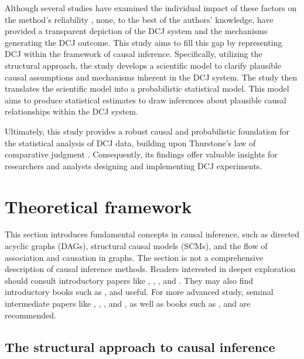 \documentclass[
  authoryear,
  preprint,
  1p]{elsarticle}
\begin{document}
Although several studies have examined the individual impact of these
factors on the method's reliability
\citep{Bramley_2015, Pollitt_2012b, Bramley_et_al_2019, Verhavert_et_al_2019, Crompvoets_et_al_2022, vanDaal_et_al_2017, Gijsen_et_al_2021, Bouwer_et_al_2023},
none, to the best of the authors' knowledge, have provided a transparent
depiction of the DCJ system and the mechanisms generating the DCJ
outcome. This study aims to fill this gap by representing DCJ within the
framework of causal inference. Specifically, utilizing the structural
approach, the study develops a scientific model to clarify plausible
causal assumptions and mechanisms inherent in the DCJ system. The study
then translates the scientific model into a probabilistic statistical
model. This model aims to produce statistical estimates to draw
inferences about plausible causal relationships within the DCJ system.

Ultimately, this study provides a robust causal and probabilistic
foundation for the statistical analysis of DCJ data, building upon
Thurstone's law of comparative judgment \citeyearpar{Thurstone_1927}.
Consequently, its findings offer valuable insights for researchers and
analysts designing and implementing DCJ experiments.

\section{Theoretical framework}\label{sec-framework}

This section introduces fundamental concepts in causal inference, such
as directed acyclic graphs (DAGs), structural causal models (SCMs), and
the flow of association and causation in graphs. The section is not a
comprehensive description of causal inference methods. Readers
interested in deeper exploration should consult introductory papers like
\citet{Pearl_2010}, \citet{Rohrer_2018}, \citet{Pearl_2019}, and
\citet{Cinelli_et_al_2020}. They may also find introductory books such
as \citet{Pearl_et_al_2018}, \citet{Neal_2020} and
\citet{McElreath_2020} useful. For more advanced study, seminal
intermediate papers like \citet{Neyman_et_al_1923}, \citet{Rubin_1974},
\citet{Spirtes_et_al_1991}, and \citet{Sekhon_2009}, as well as books
such as \citet{Pearl_2009}, \citet{Morgan_et_al_2014} and
\citet{Hernan_et_al_2020} are recommended.

\subsection{The structural approach to causal
inference}\label{sec-framework-structural}
\end{document}
